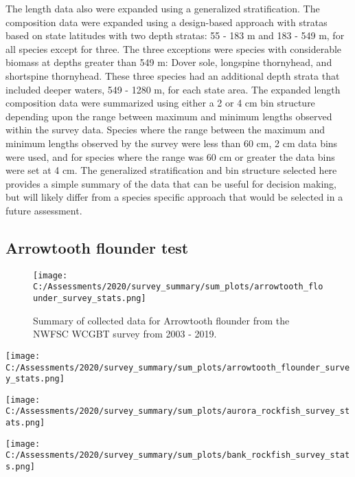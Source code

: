 \documentclass[12pt,]{article}
\begin{document}
The length data also were expanded using a generalized stratification.
The composition data were expanded using a design-based approach with
stratas based on state latitudes with two depth stratas: 55 - 183 m and
183 - 549 m, for all species except for three. The three exceptions were
species with considerable biomass at depths greater than 549 m: Dover
sole, longspine thornyhead, and shortspine thornyhead. These three
species had an additional depth strata that included deeper waters, 549
- 1280 m, for each state area. The expanded length composition data were
summarized using either a 2 or 4 cm bin structure depending upon the
range between maximum and minimum lengths observed within the survey
data. Species where the range between the maximum and minimum lengths
observed by the survey were less than 60 cm, 2 cm data bins were used,
and for species where the range was 60 cm or greater the data bins were
set at 4 cm. The generalized stratification and bin structure selected
here provides a simple summary of the data that can be useful for
decision making, but will likely differ from a species specific approach
that would be selected in a future assessment.

\newpage

\hypertarget{arrowtooth-flounder-test}{%
\subsection{Arrowtooth flounder test}\label{arrowtooth-flounder-test}}

\begin{figure}
\centering
\texttt{[image: C:/Assessments/2020/survey\_summary/sum\_plots/arrowtooth\_flounder\_survey\_stats.png]}
\caption{Summary of collected data for Arrowtooth flounder from the
NWFSC WCGBT survey from 2003 -
2019.\label{fig:nwfsc_arrowtooth_flounder_sum}}
\end{figure}

\texttt{[image: C:/Assessments/2020/survey\_summary/sum\_plots/arrowtooth\_flounder\_survey\_stats.png]}
\FloatBarrier  

\texttt{[image: C:/Assessments/2020/survey\_summary/sum\_plots/aurora\_rockfish\_survey\_stats.png]}
\FloatBarrier  

\texttt{[image: C:/Assessments/2020/survey\_summary/sum\_plots/bank\_rockfish\_survey\_stats.png]}
\FloatBarrier  
\end{document}
